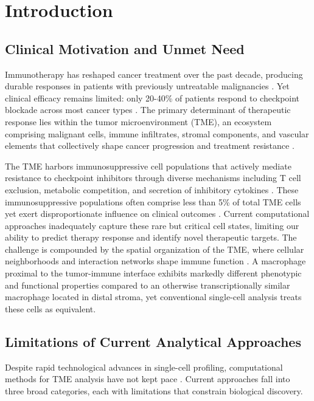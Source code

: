 \documentclass{article}
\begin{document}
\section{Introduction}

\subsection{Clinical Motivation and Unmet Need}

Immunotherapy has reshaped cancer treatment over the past decade, producing durable responses in patients with previously untreatable malignancies \citep{sharma2015future}. Yet clinical efficacy remains limited: only 20-40\% of patients respond to checkpoint blockade across most cancer types \citep{haslam2019estimation}. The primary determinant of therapeutic response lies within the tumor microenvironment (TME), an ecosystem comprising malignant cells, immune infiltrates, stromal components, and vascular elements that collectively shape cancer progression and treatment resistance \citep{hinshaw2019tumor}.

The TME harbors immunosuppressive cell populations that actively mediate resistance to checkpoint inhibitors through diverse mechanisms including T cell exclusion, metabolic competition, and secretion of inhibitory cytokines \citep{cassetta2018targeting}. These immunosuppressive populations often comprise less than 5\% of total TME cells yet exert disproportionate influence on clinical outcomes \citep{murray2014macrophage}. Current computational approaches inadequately capture these rare but critical cell states, limiting our ability to predict therapy response and identify novel therapeutic targets. The challenge is compounded by the spatial organization of the TME, where cellular neighborhoods and interaction networks shape immune function \citep{binnewies2018understanding}. A macrophage proximal to the tumor-immune interface exhibits markedly different phenotypic and functional properties compared to an otherwise transcriptionally similar macrophage located in distal stroma, yet conventional single-cell analysis treats these cells as equivalent.

\subsection{Limitations of Current Analytical Approaches}

Despite rapid technological advances in single-cell profiling, computational methods for TME analysis have not kept pace \citep{stuart2019integrative}. Current approaches fall into three broad categories, each with limitations that constrain biological discovery.
\end{document}
